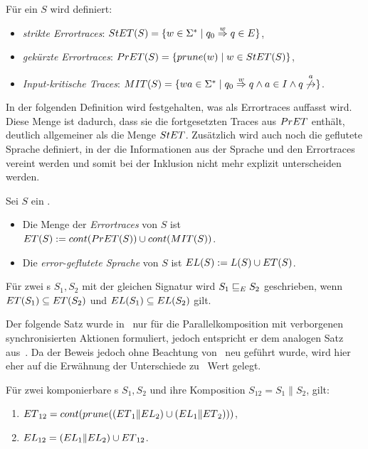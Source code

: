 \begin{Def}[Errortraces]
  \label{DefErrortraces}
  Für ein \EIO{} $S$ wird definiert:
  \begin{itemize}
    \item \emph{strikte Errortraces}: $StET{}(S)=\{w\in\Sigma
      ^*\mid q_0\overset{w}{\Rightarrow}q\in E\}$,
    \item \emph{gekürzte Errortraces}: $PrET{}(S)=\{prune{}(w)\mid w\in StET{}(S)\}$,
    \item \emph{Input-kritische Traces}: $\MIT{}(S)=\{wa\in\Sigma ^*\mid
      q_0\overset{w}{\Rightarrow}q\wedge a\in I\wedge
    q\overset{a}{\not{\hspace{-0.1cm}\rightarrow}}\}$.
  \end{itemize}
\end{Def}

In der folgenden Definition wird festgehalten, was als Errortraces auffasst
wird. Diese Menge ist dadurch, dass sie die fortgesetzten Traces aus $PrET{}$
enthält, deutlich allgemeiner als die Menge $StET{}$. Zusätzlich wird auch noch
die geflutete Sprache definiert, in der die Informationen aus der Sprache und den
Errortraces vereint werden und somit bei der Inklusion nicht mehr explizit
unterscheiden werden.

\begin{Def}
  \label{DefETEL}
  Sei $S$ ein \EIO{}.
  \begin{itemize}
    \item Die Menge der \emph{Errortraces} von $S$ ist $ET{}(S):=cont{}(PrET{}(S))\cup
      cont{}(MIT{}(S))$.
    \item Die \emph{error-geflutete Sprache} von $S$ ist $EL{}(S):=L(S)\cup ET{}(S)$.
  \end{itemize}
  Für zwei \EIO{}s $S_1, S_2$ mit der gleichen Signatur wird
  $S_1\sqsubseteq _E S_2$ geschrieben, wenn $ET{}(S_1)\subseteq ET{}(S_2)$ und
  $EL{}(S_1)\subseteq EL{}(S_2)$ gilt.
\end{Def}

Der folgende Satz wurde in~\cite{Vogler2014EIO} nur für die Parallelkomposition
mit verborgenen synchronisierten Aktionen formuliert, jedoch entspricht er dem
analogen Satz aus~\cite{Schlosser2012BA}. Da der Beweis jedoch ohne Beachtung
von~\cite{Schlosser2012BA} neu geführt wurde, wird hier eher auf die
Erwähnung der Unterschiede zu~\cite{Vogler2014EIO} Wert gelegt.

\begin{satz}
  \label{satzErrorSemanik}
  Für zwei komponierbare \EIO{}s $S_1, S_2$ und ihre Komposition
  $S_{12}=S_1\|S_2$, gilt:
  \begin{enumerate}
    \item
      $ET{}_{12}=cont{}(prune{}((ET{}_1\|EL{}_2)\cup(EL{}_1\|ET{}_2)))$,
    \item $EL{}_{12}=(EL{}_1\|EL{}_2)\cup ET{}_{12}$.
  \end{enumerate}
\end{satz}

